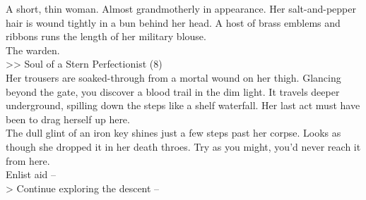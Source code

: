 A short, thin woman. Almost grandmotherly in appearance. Her salt-and-pepper hair is wound tightly in a bun behind her head. A host of brass emblems and ribbons runs the length of her military blouse.\\

The warden.\\
>> Soul of a Stern Perfectionist (8)\\

Her trousers are soaked-through from a mortal wound on her thigh. Glancing beyond the gate, you discover a blood trail in the dim light. It travels deeper underground, spilling down the steps like a shelf waterfall. Her last act must have been to drag herself up here.\\

The dull glint of an iron key shines just a few steps past her corpse. Looks as though she dropped it in her death throes. Try as you might, you’d never reach it from here.\\

 Enlist aid -- \\
> Continue exploring the descent -- 